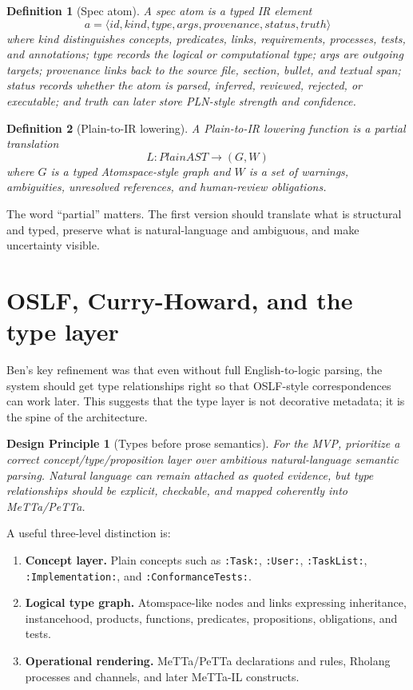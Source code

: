 \documentclass[11pt]{article}
\newtheorem{definition}{Definition}
\newtheorem{designprinciple}{Design Principle}
\begin{document}
\begin{definition}[Spec atom]
A spec atom is a typed IR element
\[
  a = \langle id, kind, type, args, provenance, status, truth \rangle
\]
where \textit{kind} distinguishes concepts, predicates, links, requirements,
processes, tests, and annotations; \textit{type} records the logical or
computational type; \textit{args} are outgoing targets; \textit{provenance}
links back to the source file, section, bullet, and textual span;
\textit{status} records whether the atom is parsed, inferred, reviewed,
rejected, or executable; and \textit{truth} can later store PLN-style strength
and confidence.
\end{definition}

\begin{definition}[Plain-to-IR lowering]
A Plain-to-IR lowering function is a partial translation
\[
  L : PlainAST \to (G, W)
\]
where \(G\) is a typed Atomspace-style graph and \(W\) is a set of warnings,
ambiguities, unresolved references, and human-review obligations.
\end{definition}

The word ``partial'' matters.  The first version should translate what is
structural and typed, preserve what is natural-language and ambiguous, and make
uncertainty visible.

\section{OSLF, Curry-Howard, and the type layer}

Ben's key refinement was that even without full English-to-logic parsing, the
system should get type relationships right so that OSLF-style correspondences
can work later.  This suggests that the type layer is not decorative metadata;
it is the spine of the architecture.

\begin{designprinciple}[Types before prose semantics]
For the MVP, prioritize a correct concept/type/proposition layer over ambitious
natural-language semantic parsing.  Natural language can remain attached as
quoted evidence, but type relationships should be explicit, checkable, and
mapped coherently into MeTTa/PeTTa.
\end{designprinciple}

A useful three-level distinction is:
\begin{enumerate}
  \item \textbf{Concept layer.} Plain concepts such as \texttt{:Task:},
        \texttt{:User:}, \texttt{:TaskList:}, \texttt{:Implementation:}, and
        \texttt{:ConformanceTests:}.
  \item \textbf{Logical type graph.} Atomspace-like nodes and links expressing
        inheritance, instancehood, products, functions, predicates,
        propositions, obligations, and tests.
  \item \textbf{Operational rendering.} MeTTa/PeTTa declarations and rules,
        Rholang processes and channels, and later MeTTa-IL constructs.
\end{enumerate}
\end{document}

